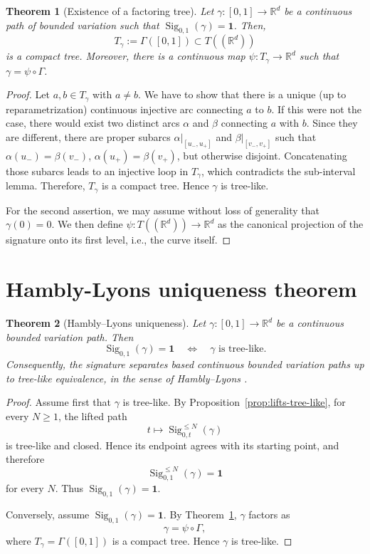 \documentclass[11pt]{article}
\newtheorem{theorem}{Theorem}[section]
\theoremstyle{definition}
\newcommand{\R}{\mathbb{R}}
\newcommand{\Sig}{\operatorname{Sig}}
\newcommand{\id}{\mathbf{1}}
\begin{document}
\begin{theorem}[Existence of a factoring tree]\label{thm:quotient-tree}
Let $ \gamma:[0,1]\to\R^d $ be a continuous path of bounded variation such that $ \Sig_{0,1}(\gamma)=\id $. Then, 
$$ T_\gamma := \Gamma([0,1]) \subset T((\R^d))$$
is a compact tree. Moreover, there is a continuous map $  \psi:T_\gamma\to\R^d$ such that 
  $\gamma=\psi\circ \Gamma$. 
\end{theorem}
\begin{proof}
Let $a,b \in T_\gamma$ with $a \neq b$. We have to show that there is a unique (up to reparametrization) continuous injective arc connecting $a$ to $b$. If this were not the case, there would exist two distinct arcs $\alpha$ and $\beta$ connecting $a$ with $b$. Since they are different, there are proper subarcs $\alpha|_{[u_-,u_+]}$ and $\beta|_{[v_-,v_+]}$ such that $\alpha(u_-)=\beta(v_-)$, $\alpha(u_+)=\beta(v_+)$, but otherwise disjoint. Concatenating those subarcs leads to an injective loop in $T_\gamma$, which contradicts the sub-interval lemma. Therefore, $T_\gamma$ is a compact tree. Hence $\gamma$ is tree-like. 

 For the second assertion, we may assume without loss of generality that $\gamma(0) = 0$. We then define $\psi:T((\R^d))\to\R^d$ as the canonical projection of the signature onto its first level, i.e.,  the curve itself. 
\end{proof}

\section{Hambly-Lyons uniqueness theorem}

\begin{theorem}[Hambly--Lyons uniqueness]\label{thm:main}
Let $ \gamma:[0,1]\to\R^d $ be a continuous bounded variation path. Then
\[
  \Sig_{0,1}(\gamma)=\id
  \quad\Longleftrightarrow\quad
  \gamma \text{ is tree-like}.
\]
Consequently, the signature separates based continuous bounded variation paths up to tree-like equivalence, in the sense of Hambly--Lyons \cite{HL2010}.
\end{theorem}

\begin{proof}
Assume first that $\gamma$ is tree-like. By Proposition~\ref{prop:lifts-tree-like}, for every $N\geq1$,  the lifted path
\[
  t\longmapsto \Sig^{\leq N}_{0,t}(\gamma)
\]
is tree-like and closed. Hence its endpoint agrees with its starting point, and therefore
\[
  \Sig^{\leq N}_{0,1}(\gamma)=\id
\]
for every $N$. Thus $\Sig_{0,1}(\gamma)=\id$.

Conversely, assume $\Sig_{0,1}(\gamma)=\id$. By Theorem~\ref{thm:quotient-tree}, $\gamma$ factors as
\[
  \gamma=\psi \circ \Gamma, 
\]
where $T_\gamma =  \Gamma([0,1])$ is a compact tree. 
Hence $\gamma$ is tree-like.
\end{proof}
\end{document}
